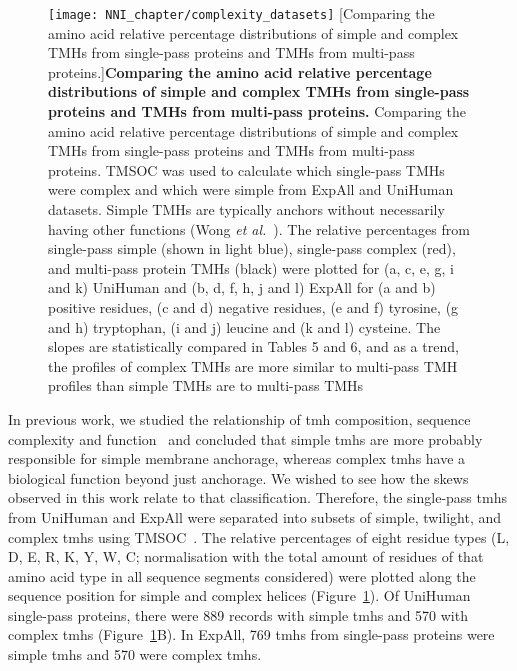 \begin{figure}[p]
\centering
\texttt{[image: NNI\_chapter/complexity\_datasets]}
[Comparing the amino acid relative percentage distributions of simple and complex TMHs from single-pass proteins and TMHs from multi-pass proteins.]{\textbf{Comparing the amino acid relative percentage distributions of simple and complex TMHs from single-pass proteins and TMHs from multi-pass proteins.} Comparing the amino acid relative percentage distributions of simple and complex TMHs from single-pass proteins and TMHs from multi-pass proteins.
TMSOC was used to calculate which single-pass TMHs were complex and which were simple from ExpAll and UniHuman datasets.
Simple TMHs are typically anchors without necessarily having other functions (Wong \textit{et al.}~\cite{Wong2010}).
The relative percentages from single-pass simple (shown in light blue), single-pass complex (red), and multi-pass protein TMHs (black) were plotted for (a, c, e, g, i and k) UniHuman and (b, d, f, h, j and l) ExpAll for (a and b) positive residues, (c and d) negative residues, (e and f) tyrosine, (g and h) tryptophan, (i and j) leucine and (k and l) cysteine.
The slopes are statistically compared in Tables 5 and 6, and as a trend, the profiles of complex TMHs are more similar to multi-pass TMH profiles than simple TMHs are to multi-pass TMHs}

\label{fig:complexity_datasets}
\end{figure}

In previous work, we studied the relationship of \gls{tmh} composition, sequence complexity and function~\cite{Wong2010, Wong2011, Wong2012} and concluded that simple \gls{tmh}s are more probably responsible for simple membrane anchorage, whereas complex \gls{tmh}s have a biological function beyond just anchorage.
We wished to see how the skews observed in this work relate to that classification.
Therefore, the single-pass \gls{tmh}s from UniHuman and ExpAll were separated into subsets of simple, twilight, and complex \gls{tmh}s using TMSOC~\cite{Wong2011, Wong2012}.
The relative percentages of eight residue types (L, D, E, R, K, Y, W, C\@; normalisation with the total amount of residues of that amino acid type in all sequence segments considered) were plotted along the sequence position for simple and complex helices (Figure~\ref{fig:complexity_datasets}).
Of UniHuman single-pass proteins, there were 889 records with simple \gls{tmh}s and 570 with complex \gls{tmh}s (Figure~\ref{fig:complexity_datasets}B).
In ExpAll, 769 \gls{tmh}s from single-pass proteins were simple \gls{tmh}s and 570 were complex \gls{tmh}s.

